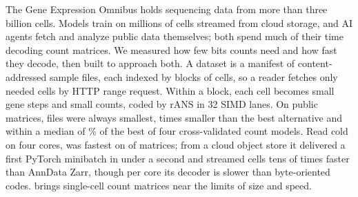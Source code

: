 The Gene Expression Omnibus holds sequencing data from more than three billion cells. Models train on millions of cells
streamed from cloud storage, and AI agents fetch and analyze public data themselves; both spend much of their time
decoding count matrices. We measured how few bits counts need and how fast they decode, then built \sone{} to approach
both. A \sone{} dataset is a manifest of content-addressed sample files, each indexed by blocks of cells, so a reader
fetches only needed cells by HTTP range request. Within a block, each cell becomes small gene steps and small counts,
coded by rANS in 32 SIMD lanes. On  public matrices, \sone{} files were always smallest,
 times smaller than the best alternative and within a median of \% of the best of four
cross-validated count models. Read cold on four cores, \sone{} was fastest on  of
 matrices; from a cloud object store it delivered a first PyTorch minibatch in under a second and
streamed cells tens of times faster than AnnData Zarr, though per core its decoder is slower than byte-oriented codes.
\sone{} brings single-cell count matrices near the limits of size and speed.
